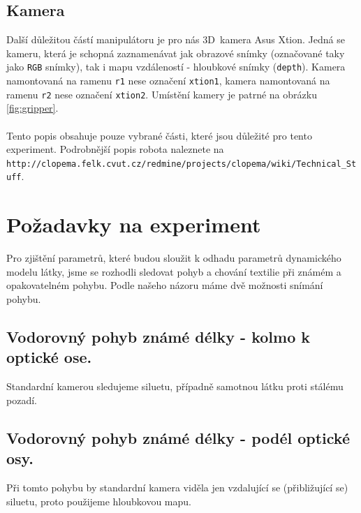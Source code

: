 \documentclass[10pt,a4paper,titlepage,oneside]{report}
\begin{document}
\subsection{Kamera}
\label{subsec:camera}
Další důležitou částí manipulátoru je pro nás 3D~kamera Asus Xtion. Jedná se kameru, která je schopná zaznamenávat jak obrazové snímky (označované taky jako \verb|RGB| snímky), tak i mapu vzdáleností - hloubkové snímky (\verb|depth|). Kamera namontovaná na ramenu \verb|r1| nese označení \verb|xtion1|, kamera namontovaná na ramenu \verb|r2| nese označení \verb|xtion2|. Umístění kamery je patrné na obrázku \ref{fig:gripper}.\\
\\



\noindent Tento popis obsahuje pouze vybrané části, které jsou důležité pro tento experiment. Podrobnější popis robota naleznete na \verb|http://clopema.felk.cvut.cz/redmine/projects/clopema/wiki/Technical_Stuff|. \\


\section{Požadavky na experiment}
\label{sec:experiment}
Pro zjištění parametrů, které budou sloužit k odhadu parametrů dynamického modelu látky, jsme se rozhodli sledovat pohyb a chování textilie při známém a opakovatelném pohybu. 
Podle našeho názoru máme dvě možnosti snímání pohybu.

\subsection*{Vodorovný pohyb známé délky - kolmo k optické ose.}
Standardní kamerou sledujeme siluetu, případně samotnou látku proti stálému pozadí.

\subsection*{Vodorovný pohyb známé délky - podél optické osy.}
Při tomto pohybu by standardní kamera viděla jen vzdalující se (přibližující se) siluetu, proto použijeme hloubkovou mapu.
\end{document}
